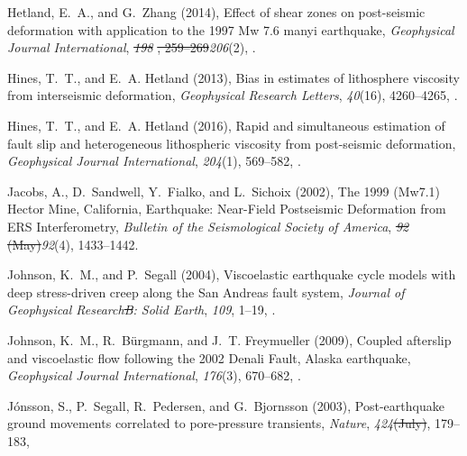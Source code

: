 \documentclass[draft,linenumbers]{AGUJournal}
\providecommand{\DIFadd}[1]{{\protect\color{blue}\uwave{#1}}} %
\providecommand{\DIFdel}[1]{{\protect\color{red}\sout{#1}}}                      %
\providecommand{\DIFaddbegin}{} %
\providecommand{\DIFaddend}{} %
\providecommand{\DIFdelbegin}{} %
\providecommand{\DIFdelend}{} %
\begin{document}
\begin{thebibliography}{52}
Hetland, E.~A., and G.~Zhang (2014), {Effect of shear zones on post-seismic deformation with application to the 1997 Mw 7.6 manyi earthquake}, \textit{Geophysical Journal International}, \DIFdelbegin \textit{\DIFdel{198}}%
\DIFdel{, 259--269}\DIFdelend \DIFaddbegin \textit{206}(2)\DIFadd{, 1--11}\DIFaddend , .

Hines, T.~T., and E.~A. Hetland (2013), {Bias in estimates of lithosphere viscosity from interseismic deformation}, \textit{Geophysical Research Letters}, \textit{40}(16), 4260--4265, .

Hines, T.~T., and E.~A. Hetland (2016), {Rapid and simultaneous estimation of fault slip and heterogeneous lithospheric viscosity from post-seismic deformation}, \textit{Geophysical Journal International}, \textit{204}(1), 569--582, .

Jacobs, A., D.~Sandwell, Y.~Fialko, and L.~Sichoix (2002), {The 1999 (Mw7.1) Hector Mine, California, Earthquake: Near-Field Postseismic Deformation from ERS Interferometry}, \textit{Bulletin of the Seismological Society of America}, \DIFdelbegin \textit{\DIFdel{92}}%
\DIFdel{(May)}\DIFdelend \DIFaddbegin \textit{92}(4)\DIFaddend , 1433--1442.

Johnson, K.~M., and P.~Segall (2004), {Viscoelastic earthquake cycle models with deep stress-driven creep along the San Andreas fault system}, \textit{Journal of Geophysical Research\DIFdelbegin \DIFdel{B}\DIFdelend : Solid Earth}, \textit{109}\DIFaddbegin \DIFadd{(B10403)}\DIFaddend , 1--19, .

Johnson, K.~M., R.~B{\"{u}}rgmann, and J.~T. Freymueller (2009), {Coupled afterslip and viscoelastic flow following the 2002 Denali Fault, Alaska earthquake}, \textit{Geophysical Journal International}, \textit{176}(3), 670--682, .

J{\'{o}}nsson, S., P.~Segall, R.~Pedersen, and G.~Bjornsson (2003), {Post-earthquake ground movements correlated to pore-pressure transients}, \textit{Nature}, \textit{424}\DIFdelbegin \DIFdel{(July)}\DIFdelend , 179--183, 


\end{thebibliography}
\end{document}

